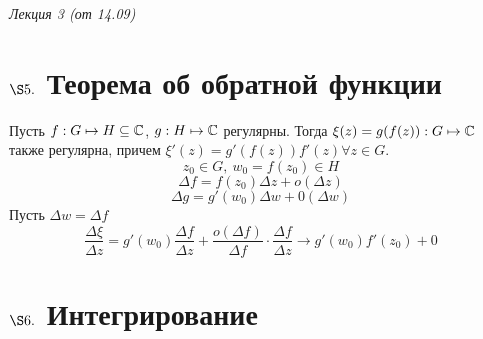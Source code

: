 \begin{flushright}
    \textit{Лекция 3 (от 14.09)}
\end{flushright}
\section{$\S 5.$ Теорема об обратной функции}
\theorem
Пусть $f: G \mapsto H \subseteq \mathbb{C}$, $g: H \mapsto \mathbb{C}$ регулярны.
Тогда $\xi(z) = g(f(z)): G \mapsto \mathbb{C}$ также регулярна, причем $\xi'(z) =
g'(f(z))f'(z) \forall z \in G$.
\pr
$$z_0 \in G, \ w_0 = f(z_0) \in H$$
$$\Delta f = f(z_0)\Delta z + o(\Delta z)$$
$$\Delta g = g'(w_0) \Delta w + 0(\Delta w)$$
Пусть $\Delta w = \Delta f$
$$\frac{\Delta \xi}{\Delta z} = g'(w_0) \frac{\Delta f}{\Delta z} +
\frac{o(\Delta f)}{\Delta f} \cdot \frac{\Delta f}{\Delta z} \rightarrow
g'(w_0)f'(z_0) + 0$$
\section{$\S 6.$ Интегрирование}